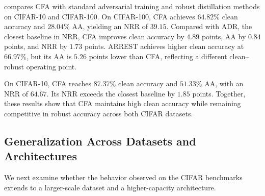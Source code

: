 compares CFA with standard adversarial training and robust
distillation methods on CIFAR-10 and CIFAR-100.
On CIFAR-100, CFA achieves \(64.82\%\) clean accuracy and \(28.04\%\) AA,
yielding an NRR of \(39.15\).
Compared with ADR, the closest baseline in NRR, CFA improves clean accuracy
by \(4.89\) points, AA by \(0.84\) points, and NRR by \(1.73\) points.
ARREST achieves higher clean accuracy at \(66.97\%\), but its AA is
\(5.26\) points lower than CFA, reflecting a different clean--robust
operating point.

On CIFAR-10, CFA reaches \(87.37\%\) clean accuracy and \(51.33\%\) AA,
with an NRR of \(64.67\).
Its NRR exceeds the closest baseline by \(1.85\) points.
Together, these results show that CFA maintains high clean accuracy while
remaining competitive in robust accuracy across both CIFAR datasets.


\subsection{Generalization Across Datasets and Architectures}

We next examine whether the behavior observed on the CIFAR benchmarks
extends to a larger-scale dataset and a higher-capacity architecture.

